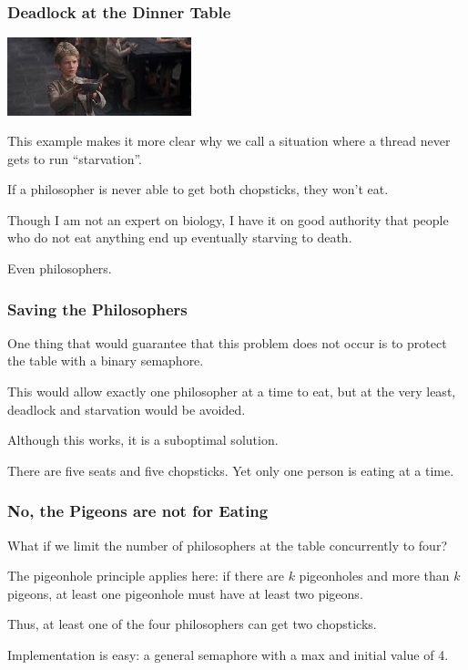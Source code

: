 \begin{frame}
\frametitle{Deadlock at the Dinner Table}

\begin{center}
	\includegraphics[width=0.4\textwidth]{images/olivertwist.jpeg}
\end{center}

This example makes it more clear why we call a situation where a thread never gets to run ``starvation''. 

If a philosopher is never able to get both chopsticks, they won't eat.

Though I am not an expert on biology, I have it on good authority that people who do not eat anything end up eventually starving to death. 

Even philosophers.

\end{frame}

\begin{frame}
\frametitle{Saving the Philosophers}

One thing that would guarantee that this problem does not occur is to protect the table with a binary semaphore. 

This would allow exactly one philosopher at a time to eat, but at the very least, deadlock and starvation would be avoided. 

Although this works, it is a suboptimal solution. 

There are five seats and five chopsticks. Yet only one person is eating at a time. 

\end{frame}


\begin{frame}
\frametitle{No, the Pigeons are not for Eating}

What if we limit the number of philosophers at the table concurrently to four? 

The pigeonhole principle applies here: if there are $k$ pigeonholes and more than $k$ pigeons, at least one pigeonhole must have at least two pigeons. 

Thus, at least one of the four philosophers can get two chopsticks. 

Implementation is easy: a general semaphore with a max and initial value of 4.

\end{frame}


